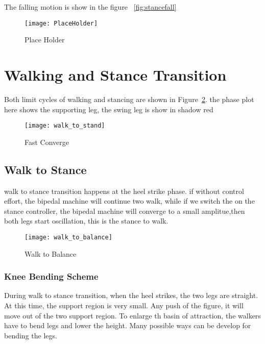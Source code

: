 The falling motion is show in the figure ~\ref{fig:stancefall}
\begin{figure}[!htbp]
  \begin{center}
      \texttt{[image: PlaceHolder]}
    \caption{Place Holder}
    \label{fig:fastconverge}
\end{center}
\end{figure}




\section{Walking and Stance Transition}
Both limit cycles of walking and stancing are shown in Figure~\ref{fig:walksstance}.
the phase plot here shows the supporting leg, the swing leg is show in shadow red

\begin{figure}[!htbp]
  \begin{center}
    \texttt{[image: walk\_to\_stand]}
    \caption{Fast Converge}
    \label{fig:walksstance}
	\end{center}
\end{figure}




\subsection{Walk to Stance}
walk to stance transition happens at the heel strike phase.
if without control effort, the bipedal machine will continue two walk, while if we switch the on the stance controller,
the bipedal machine will converge to a small amplitue,then both legs start oscillation, this is the stance to walk.


\begin{figure}[!htbp]
  \begin{center}
      \texttt{[image: walk\_to\_balance]}
    \caption{Walk to Balance}
    \label{fig:walk2stance}
\end{center}
\end{figure}




\subsubsection*{Knee Bending Scheme}
During walk to stance transition, when the heel strikes, the two legs are straight. 
At this time, the support region is very small.
Any push of the figure, it will move out of the two support region.
To enlarge th basin of attraction, the walkers have to bend legs and lower the height.
Many possible ways can be develop for bending the legs.


